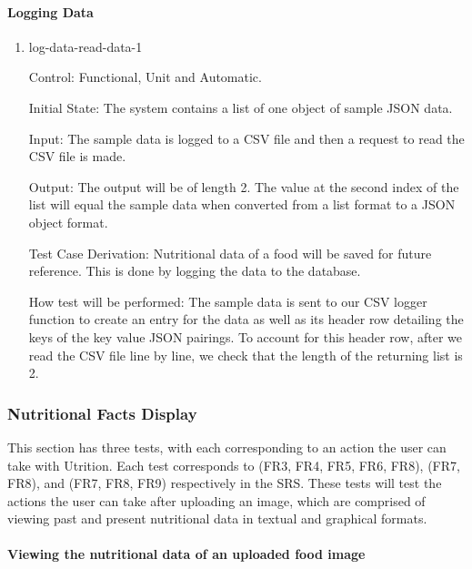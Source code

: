 \documentclass[12pt, titlepage]{article}
\begin{document}
	\paragraph{Logging Data}
	
	\begin{enumerate}
		
		\item{log-data-read-data-1\\}
		
		Control: Functional, Unit and Automatic.
		
		Initial State: The system contains a list of one object of sample JSON data.
		
		Input: The sample data is logged to a CSV file and then a request to read the CSV file is made.
		
		Output: The output will be of length 2. The value at the second index of the list will equal the sample data when converted from a list format to a JSON object format. 
		
		Test Case Derivation: Nutritional data of a food will be saved for 
		future reference. This is done by logging the data to the database.
		
		How test will be performed: The sample data is sent to our CSV logger function to create an entry for the data as well as its header row detailing the keys of the key value JSON pairings. To account for this header row, after we read the CSV file line by line, we check that the length of the returning list is 2.
		
	\end{enumerate}
	
	\subsubsection{Nutritional Facts Display}
	This section has three tests, with each corresponding to an action the user can take with Utrition. Each test corresponds to (FR3, FR4, FR5, FR6, FR8), (FR7, FR8), and (FR7, FR8, FR9) respectively in the SRS. These tests will test the actions the user can take after uploading an image, which are comprised of viewing past and present nutritional data in textual and graphical formats.
	
	
	
	\paragraph{Viewing the nutritional data of an uploaded food image}
	
\end{document}
